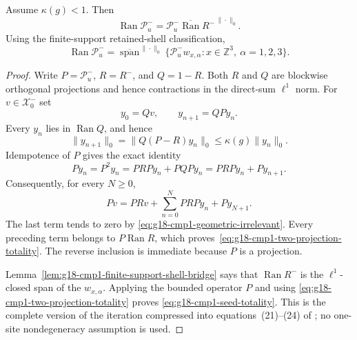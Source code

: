 \begin{lemma}
\label{lem:g18-cmp1-coefficient-totality-complete}
Assume $\kappa(g)<1$.  Then
\begin{equation}
 \operatorname{Ran}\mathcal P_u^-
 =\overline{\mathcal P_u^-\operatorname{Ran}R^-}^{\,\|\cdot\|_0}.
 \label{eq:g18-cmp1-two-projection-totality}
\end{equation}
Using the finite-support retained-shell classification,
\begin{equation}
 \operatorname{Ran}\mathcal P_u^-
 =\overline{\operatorname{span}}^{\,\|\cdot\|_0}
 \{\mathcal P_u^-w_{x,\alpha}:
 x\in\mathbb Z^3,\ \alpha=1,2,3\}.
 \label{eq:g18-cmp1-seed-totality}
\end{equation}
\end{lemma}

\begin{proof}
Write $P=\mathcal P_u^-$, $R=R^-$, and $Q=1-R$.  Both $R$ and $Q$ are
blockwise orthogonal projections and hence contractions in the direct-sum
$\ell^1$ norm.  For $v\in\mathcal X_0^-$ set
\[
 y_0=Qv,
 \qquad y_{n+1}=QPy_n.
\]
Every $y_n$ lies in $\operatorname{Ran}Q$, and hence
\begin{equation}
 \|y_{n+1}\|_0
 =\|Q(P-R)y_n\|_0
 \le\kappa(g)\|y_n\|_0.
 \label{eq:g18-cmp1-geometric-irrelevant}
\end{equation}
Idempotence of $P$ gives the exact identity
\begin{equation}
 Py_n=P^2y_n=PRPy_n+PQPy_n=PRPy_n+Py_{n+1}.
 \label{eq:g18-cmp1-iteration-identity}
\end{equation}
Consequently, for every $N\ge0$,
\begin{equation}
 Pv=PRv+\sum_{n=0}^{N}PRPy_n+Py_{N+1}.
 \label{eq:g18-cmp1-iteration-finite}
\end{equation}
The last term tends to zero by
\eqref{eq:g18-cmp1-geometric-irrelevant}.  Every preceding term belongs to
$P\operatorname{Ran}R$, which proves~\eqref{eq:g18-cmp1-two-projection-totality}.
The reverse inclusion is immediate because $P$ is a projection.

 Lemma~\ref{lem:g18-cmp1-finite-support-shell-bridge} says that
 $\operatorname{Ran}R^-$ is the $\ell^1$-closed span of the
 $w_{x,\alpha}$.
Applying the bounded operator $P$ and using
\eqref{eq:g18-cmp1-two-projection-totality} proves
\eqref{eq:g18-cmp1-seed-totality}.  This is the complete version of the
iteration compressed into equations~(21)--(24) of
\cite{Yarotsky2004QP}; no one-site nondegeneracy assumption is used.
\end{proof}

